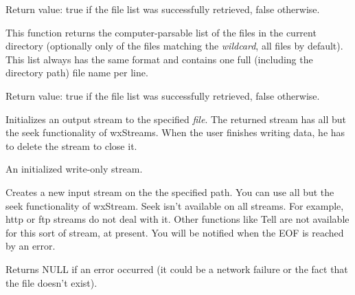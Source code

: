 Return value: true if the file list was successfully retrieved, false
otherwise.




\label{wxftpgetfileslist}


This function returns the computer-parsable list of the files in the current
directory (optionally only of the files matching the {\it wildcard}, all files
by default). This list always has the same format and contains one full
(including the directory path) file name per line.

Return value: true if the file list was successfully retrieved, false
otherwise.





Initializes an output stream to the specified {\it file}. The returned
stream has all but the seek functionality of wxStreams. When the user finishes
writing data, he has to delete the stream to close it.


An initialized write-only stream.





\label{wxftpgetinput}


Creates a new input stream on the the specified path. You can use all but the seek
functionality of wxStream. Seek isn't available on all streams. For example,
http or ftp streams do not deal with it. Other functions like Tell
are not available for this sort of stream, at present.
You will be notified when the EOF is reached by an error.


Returns NULL if an error occurred (it could be a network failure or the fact
that the file doesn't exist).

